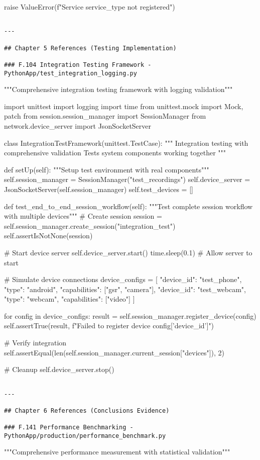 \documentclass[11pt,a4paper]{report}
\begin{document}
        raise ValueError(f"Service {service\_type} not registered")
\begin{verbatim}

---

## Chapter 5 References (Testing Implementation)

### F.104 Integration Testing Framework - PythonApp/test_integration_logging.py

\end{verbatim}
"""Comprehensive integration testing framework with logging validation"""

import unittest
import logging
import time
from unittest.mock import Mock, patch
from session.session\_manager import SessionManager
from network.device\_server import JsonSocketServer


class IntegrationTestFramework(unittest.TestCase):
    """
    Integration testing with comprehensive validation
    Tests system components working together
    """

    def setUp(self):
        """Setup test environment with real components"""
        self.session\_manager = SessionManager("test\_recordings")
        self.device\_server = JsonSocketServer(self.session\_manager)
        self.test\_devices = []

    def test\_end\_to\_end\_session\_workflow(self):
        """Test complete session workflow with multiple devices"""
        \# Create session
        session = self.session\_manager.create\_session("integration\_test")
        self.assertIsNotNone(session)

        \# Start device server
        self.device\_server.start()
        time.sleep(0.1)  \# Allow server to start

        \# Simulate device connections
        device\_configs = [
            {"device\_id": "test\_phone", "type": "android", "capabilities": ["gsr", "camera"]},
            {"device\_id": "test\_webcam", "type": "webcam", "capabilities": ["video"]}
        ]

        for config in device\_configs:
            result = self.session\_manager.register\_device(config)
            self.assertTrue(result, f"Failed to register device {config['device\_id']}")

        \# Verify integration
        self.assertEqual(len(self.session\_manager.current\_session["devices"]), 2)

        \# Cleanup
        self.device\_server.stop()
\begin{verbatim}

---

## Chapter 6 References (Conclusions Evidence)

### F.141 Performance Benchmarking - PythonApp/production/performance_benchmark.py

\end{verbatim}
"""Comprehensive performance measurement with statistical validation"""
\end{document}
